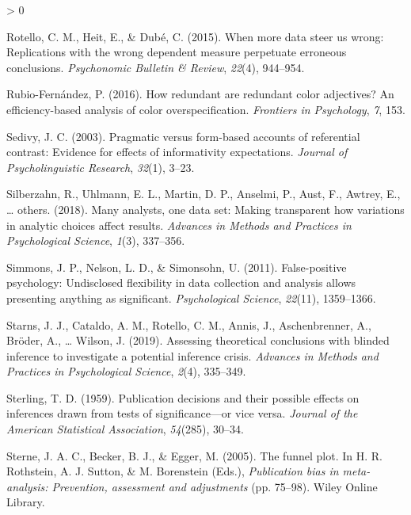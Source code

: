 \documentclass[
  english,
  man,floatsintext]{apa6}
\newlength{\cslhangindent}
\newenvironment{CSLReferences}[2] %
 {%
  \setlength{\parindent}{0pt}
  \ifodd #1 \everypar{\setlength{\hangindent}{\cslhangindent}}\ignorespaces\fi
  \ifnum #2 > 0
  \setlength{\parskip}{#2\baselineskip}
  \fi
 }%
 {}
\begin{document}
\begin{CSLReferences}{1}{0}
\leavevmode\hypertarget{ref-rotello2015more}{}%
Rotello, C. M., Heit, E., \& Dubé, C. (2015). When more data steer us wrong: {R}eplications with the wrong dependent measure perpetuate erroneous conclusions. \emph{Psychonomic Bulletin \& Review}, \emph{22}(4), 944--954.

\leavevmode\hypertarget{ref-rubio2016redundant}{}%
Rubio-Fernández, P. (2016). How redundant are redundant color adjectives? An efficiency-based analysis of color overspecification. \emph{Frontiers in Psychology}, \emph{7}, 153.

\leavevmode\hypertarget{ref-sedivy2003pragmatic}{}%
Sedivy, J. C. (2003). Pragmatic versus form-based accounts of referential contrast: Evidence for effects of informativity expectations. \emph{Journal of Psycholinguistic Research}, \emph{32}(1), 3--23.

\leavevmode\hypertarget{ref-silberzahn2018many}{}%
Silberzahn, R., Uhlmann, E. L., Martin, D. P., Anselmi, P., Aust, F., Awtrey, E., \ldots{} others. (2018). Many analysts, one data set: Making transparent how variations in analytic choices affect results. \emph{Advances in Methods and Practices in Psychological Science}, \emph{1}(3), 337--356.

\leavevmode\hypertarget{ref-simmons2011false}{}%
Simmons, J. P., Nelson, L. D., \& Simonsohn, U. (2011). False-positive psychology: Undisclosed flexibility in data collection and analysis allows presenting anything as significant. \emph{Psychological Science}, \emph{22}(11), 1359--1366.

\leavevmode\hypertarget{ref-starns2019assessing}{}%
Starns, J. J., Cataldo, A. M., Rotello, C. M., Annis, J., Aschenbrenner, A., Bröder, A., \ldots{} Wilson, J. (2019). Assessing theoretical conclusions with blinded inference to investigate a potential inference crisis. \emph{Advances in Methods and Practices in Psychological Science}, \emph{2}(4), 335--349.

\leavevmode\hypertarget{ref-sterling1959publication}{}%
Sterling, T. D. (1959). Publication decisions and their possible effects on inferences drawn from tests of significance---or vice versa. \emph{Journal of the American Statistical Association}, \emph{54}(285), 30--34.

\leavevmode\hypertarget{ref-sterne2005}{}%
Sterne, J. A. C., Becker, B. J., \& Egger, M. (2005). The funnel plot. In H. R. Rothstein, A. J. Sutton, \& M. Borenstein (Eds.), \emph{Publication bias in meta-analysis: Prevention, assessment and adjustments} (pp. 75--98). Wiley Online Library.


\end{CSLReferences}
\end{document}
